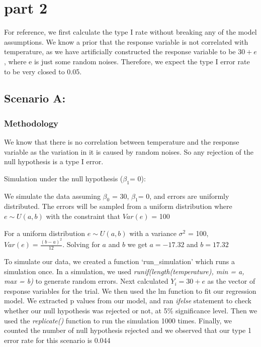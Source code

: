 \documentclass[
]{article}
\begin{document}
\hypertarget{part-2}{%
\section{part 2}\label{part-2}}

For reference, we first calculate the type I rate without breaking any
of the model assumptions. We know a prior that the response variable is
not correlated with temperature, as we have artificially constructed the
response variable to be \(30 + e\), where e is just some random noises.
Therefore, we expect the type I error rate to be very closed to 0.05.

\hypertarget{scenario-a}{%
\subsection{Scenario A:}\label{scenario-a}}

\hypertarget{methodology}{%
\subsubsection{Methodology}\label{methodology}}

We know that there is no correlation between temperature and the
response variable as the variation in it is caused by random noises. So
any rejection of the null hypothesis is a type I error.

Simulation under the null hypothesis (\(\beta_{1}\)= 0):

We simulate the data assuming \(\beta_{0}\) = 30, \(\beta_{1}\)= 0, and
errors are uniformly distributed. The errors will be sampled from a
uniform distribution where \(e \sim U(a,b)\) with the constraint that
\(Var(e)\) = 100

For a uniform distribution \(e \sim U(a,b)\) with a variance
\(\sigma^2\) = 100, \(Var(e) = \frac{(b-a)^2}{12}\). Solving for \(a\)
and \(b\) we get \(a = -17.32\) and \(b= 17.32\)

To simulate our data, we created a function `run\_simulation' which runs
a simulation once. In a simulation, we used
\emph{runif(length(temperature), min = a, max = b)} to generate random
errors. Next calculated \(Y_{i}=30 + e\) as the vector of response
variables for the trial. We then used the lm function to fit our
regression model. We extracted p values from our model, and ran
\emph{ifelse} statement to check whether our null hypothesis was
rejected or not, at 5\% significance level. Then we used the
\emph{replicate()} function to run the simulation 1000 times. Finally,
we counted the number of null hypothesis rejected and we observed that
our type 1 error rate for this scenario is 0.044
\end{document}
